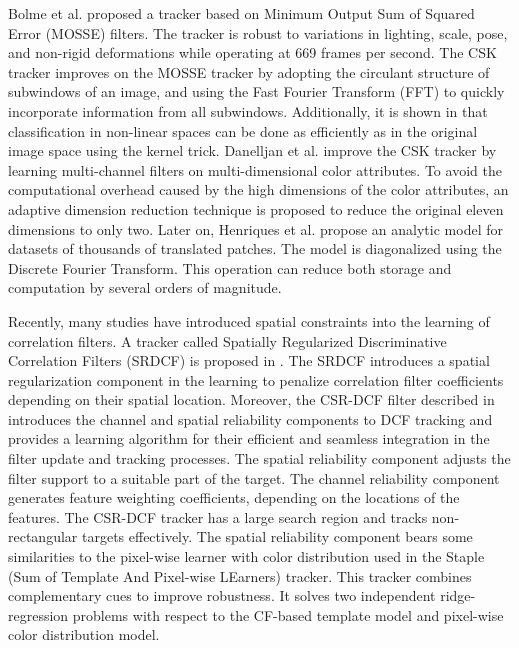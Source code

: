 \documentclass[review]{elsarticle}
\begin{document}
\begin{CJK*}{UTF8}{gbsn}
Bolme et al. proposed a tracker \cite{Bolme2010VisualOT} based on Minimum Output Sum of Squared Error (MOSSE) filters. The tracker is robust to variations in lighting, scale, pose, and non-rigid deformations while operating at 669 frames per second.
The CSK tracker \cite{Henriques2012ExploitingTC} improves on the MOSSE tracker by adopting the circulant structure of subwindows of an image, and using the Fast Fourier Transform (FFT) to quickly incorporate information from all subwindows. Additionally, it is shown in \cite{Henriques2012ExploitingTC} that classification in non-linear spaces can be done as efficiently as in the original image space using the kernel trick.
Danelljan et al. \cite{Danelljan2014AdaptiveCA} improve the CSK tracker by learning multi-channel filters on multi-dimensional color attributes. To avoid the computational overhead caused by the high dimensions of the color attributes, an adaptive dimension reduction technique is proposed \cite{Danelljan2014AdaptiveCA} to reduce the original eleven dimensions to only two.
Later on, Henriques et al. \cite{Henriques2015HighSpeedTW} propose an analytic model for datasets of thousands of translated patches. The model is diagonalized using the Discrete Fourier Transform. This operation can reduce both storage and computation by several orders of magnitude.

Recently, many studies \cite{Danelljan2015LearningSR, Lukezic2017DiscriminativeCF} have introduced spatial constraints into the learning of correlation filters. A tracker called Spatially Regularized Discriminative Correlation Filters (SRDCF) is proposed in \cite{Danelljan2015LearningSR}. The SRDCF introduces a spatial regularization component in the learning to penalize correlation filter coefficients depending on their spatial location.
Moreover, the CSR-DCF filter described in \cite{Lukezic2017DiscriminativeCF} introduces the channel and spatial reliability components to DCF tracking and provides a learning algorithm for their efficient and seamless integration in the filter update and tracking processes. The spatial reliability component adjusts the filter support to a suitable part of the target. The channel reliability component generates feature weighting coefficients, depending on the locations of the features. The CSR-DCF tracker has a large search region and tracks non-rectangular targets effectively. The spatial reliability component bears some similarities to the pixel-wise learner with color distribution used in the Staple (Sum of Template And Pixel-wise LEarners) \cite{Bertinetto2016StapleC} tracker. This tracker combines complementary cues to improve robustness. It solves two independent ridge-regression problems with respect to the CF-based template model and pixel-wise color distribution model.


\end{CJK*}
\end{document}
